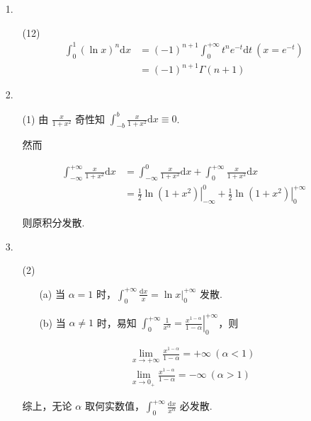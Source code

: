 \documentclass[oneside]{ctexbook} %
\begin{document}
\begin{enumerate}
    \item[1.]
    \begin{enumerate}
        \item[(12)]
        $$
        \begin{aligned}
            \int_0^1 (\ln x)^n \mathrm dx &= (-1)^{n+1} \int_0^{+\infty} t^n e^{-t} \mathrm dt \ (x = e^{-t}) \\
            &= (-1)^{n+1}\Gamma(n+1)
        \end{aligned}
        $$
    \end{enumerate}
    \item[2.]
    \begin{enumerate}
        \item[(1)]
        由 $\frac x {1+x^2}$ 奇性知 $\displaystyle \int_{-b}^b \frac x {1+x^2} \mathrm dx \equiv 0$.
        
        然而
        
        $$
        \begin{aligned}
            \int_{-\infty}^{+\infty} \frac x {1+x^2} \mathrm dx &= \int_{-\infty}^0 \frac x {1+x^2} \mathrm dx + \int_0^{+\infty} \frac x {1+x^2} \mathrm dx \\
            &= \left. \frac 1 2 \ln (1+x^2) \right|_{-\infty}^0 + \left. \frac 1 2 \ln (1+x^2) \right|_0^{+\infty}
        \end{aligned}
        $$
        
        则原积分发散.
    \end{enumerate}
    \item[3.]
    \begin{enumerate}
        \item[(2)]
        \begin{enumerate}
            \item[(a)]
            当 $\alpha = 1$ 时，$\displaystyle \int_0^{+\infty} \frac {\mathrm dx} x = \ln x \big|_0^{+\infty}$ 发散.
            \item[(b)]
            当 $\alpha \neq 1$ 时，易知 $\displaystyle \int_0^{+\infty} \frac 1 {x^\alpha} = \left. \frac{x^{1-\alpha}}{1-\alpha} \right|_0^{+\infty}$，则
            
            $$
            \begin{aligned}
                \lim_{x \to +\infty} \frac{x^{1-\alpha}}{1-\alpha} = +\infty \ (\alpha < 1) \\
                \lim_{x \to 0_+} \frac{x^{1-\alpha}}{1-\alpha} = -\infty \ (\alpha > 1)
            \end{aligned}
            $$
        \end{enumerate}
        综上，无论 $\alpha$ 取何实数值，$\displaystyle \int_0^{+\infty} \frac{\mathrm dx}{x^{\alpha}} $ 必发散.
    \end{enumerate}
\end{enumerate}
\end{document}
